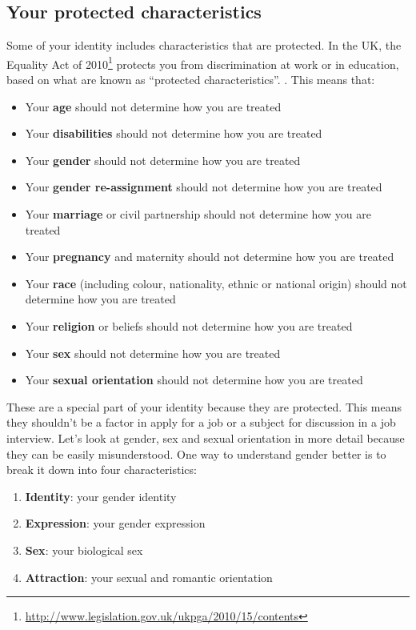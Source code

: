 \documentclass[
]{book}
\providecommand{\tightlist}{%
  \setlength{\itemsep}{0pt}\setlength{\parskip}{0pt}}
\begin{document}
\hypertarget{protected}{%
\subsection{Your protected characteristics}\label{protected}}

Some of your identity includes characteristics that are protected. In the UK, the Equality Act of 2010\footnote{\url{http://www.legislation.gov.uk/ukpga/2010/15/contents}} protects you from discrimination at work or in education, based on what are known as ``protected characteristics''. \citep{equality}. This means that:

\begin{itemize}
\tightlist
\item
  Your \textbf{age} should not determine how you are treated
\item
  Your \textbf{disabilities} should not determine how you are treated
\item
  Your \textbf{gender} should not determine how you are treated \citep{inferior, damore, damoreguardian, everydaysexism}
\item
  Your \textbf{gender re-assignment} should not determine how you are treated
\item
  Your \textbf{marriage} or civil partnership should not determine how you are treated
\item
  Your \textbf{pregnancy} and maternity should not determine how you are treated
\item
  Your \textbf{race} (including colour, nationality, ethnic or national origin) should not determine how you are treated \citep{nottalking, superior}
\item
  Your \textbf{religion} or beliefs should not determine how you are treated
\item
  Your \textbf{sex} should not determine how you are treated \citep{harassment}
\item
  Your \textbf{sexual orientation} should not determine how you are treated \citep{nosex}
\end{itemize}

These are a special part of your identity because they are protected. This means they shouldn't be a factor in apply for a job or a subject for discussion in a job interview. Let's look at gender, sex and sexual orientation in more detail because they can be easily misunderstood. One way to understand gender better is to break it down into four characteristics:

\begin{enumerate}
\def\labelenumi{\arabic{enumi}.}
\tightlist
\item
  \textbf{Identity}: your gender identity
\item
  \textbf{Expression}: your gender expression
\item
  \textbf{Sex}: your biological sex
\item
  \textbf{Attraction}: your sexual and romantic orientation
\end{enumerate}
\end{document}
